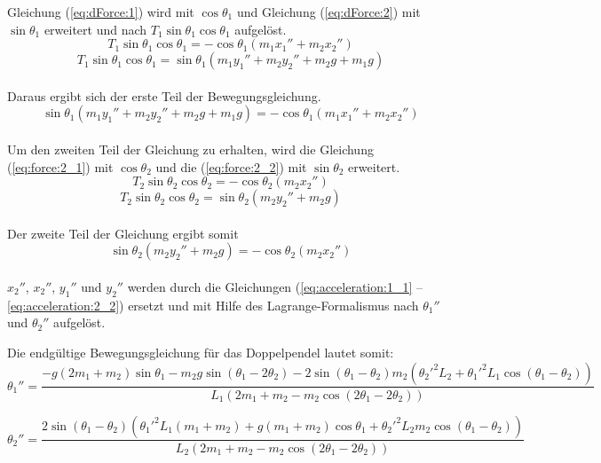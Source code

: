 \documentclass[12pt]{article}
\numberwithin{equation}{subsection}
\begin{document}
Gleichung (\ref{eq:dForce:1}) wird mit $\cos\theta_1$ und Gleichung (\ref{eq:dForce:2}) mit $\sin\theta_1$ erweitert und nach $T_1\sin\theta_1\cos\theta_1$ aufgelöst.
\begin{equation} \label{eq:thetaForce:1_1}
	T_1\sin\theta_1\cos\theta_1 = -\cos\theta_1(m_1 x_1'' + m_2 x_2'')
\end{equation}
\begin{equation} \label{eq:thetaForce:1_2}
	T_1\sin\theta_1\cos\theta_1 = \sin\theta_1(m_1 y_1'' + m_2 y_2'' + m_2 g + m_1 g)
\end{equation}
\
\\
Daraus ergibt sich der erste Teil der Bewegungsgleichung.
\begin{equation} \label{eq:motion:1}
	\sin\theta_1(m_1 y_1'' + m_2 y_2'' + m_2 g + m_1 g) = -\cos\theta_1(m_1 x_1'' + m_2 x_2'')
\end{equation}
\
\\
Um den zweiten Teil der Gleichung zu erhalten, wird die Gleichung (\ref{eq:force:2_1}) mit $\cos\theta_2$ und die (\ref{eq:force:2_2}) mit $\sin\theta_2$ erweitert.
\begin{equation} \label{eq:thetaForce:2_1}
	T_2\sin\theta_2\cos\theta_2 = -\cos\theta_2(m_2 x_2'')
\end{equation}
\begin{equation} \label{eq:thetaForce:2_2}
	T_2\sin\theta_2\cos\theta_2 = \sin\theta_2(m_2 y_2'' + m_2 g)
\end{equation}
\
\\
Der zweite Teil der Gleichung ergibt somit
\begin{equation} \label{eq:motion:2}
	\sin\theta_2(m_2 y_2'' + m_2 g) = -\cos\theta_2(m_2 x_2'')
\end{equation}
\
\\
$x_2''$, $x_2''$, $y_1''$ und $y_2''$ werden durch die Gleichungen (\ref{eq:acceleration:1_1} – \ref{eq:acceleration:2_2}) ersetzt und mit Hilfe des Lagrange-Formalismus nach $\theta_1''$ und $\theta_2''$ aufgelöst.

Die endgültige Bewegungsgleichung für das Doppelpendel lautet somit:
\begin{equation} \label{eq:final:1}
	\theta_1'' = \frac{-g(2m_1+m_2)\sin\theta_1 - m_2 g \sin(\theta_1 - 2\theta_2) -2\sin(\theta_1 - \theta_2)m_2({\theta_2'}^2 L_2 + {\theta_1'}^2 L_1\cos(\theta_1 - \theta_2))}
	{L_1(2m_1 + m_2 - m_2 \cos(2\theta_1 - 2\theta_2))}
\end{equation}

\begin{equation} \label{eq:final:2}
	\theta_2'' = \frac{2\sin(\theta_1 - \theta_2)({\theta_1'}^2 L_1(m_1 + m_2) + g(m_1 + m_2)\cos\theta_1 + {\theta_2'}^2 L_2 m_2 \cos(\theta_1 - \theta_2))}
	{L_2 (2m_1 + m_2 - m_2 \cos(2 \theta_1 - 2\theta_2))}
\end{equation}
\end{document}
